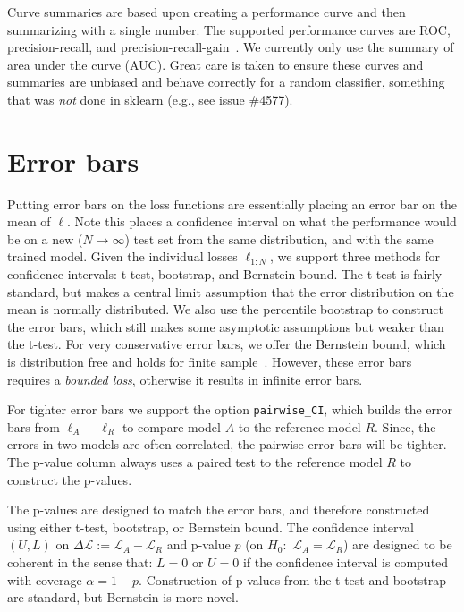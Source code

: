 \documentclass{article}
\newcommand{\Loss}{\mathcal{L}}
\newcommand{\loss}{\ell}
\newcommand{\code}{\texttt}
\begin{document}
Curve summaries are based upon creating a performance curve and then summarizing with a single number.
The supported performance curves are ROC, precision-recall, and precision-recall-gain~\citep{Flach2015}.
We currently only use the summary of area under the curve (AUC)\@.
Great care is taken to ensure these curves and summaries are unbiased and behave correctly for a random classifier, something that was \emph{not} done in sklearn (e.g., see issue \#4577)\@.

\section{Error bars}

Putting error bars on the loss functions are essentially placing an error bar on the mean of $\loss$.
Note this places a confidence interval on what the performance would be on a new ($N \rightarrow \infty$) test set from the same distribution, and with the same trained model.
Given the individual losses $\loss_{1:N}$, we support three methods for confidence intervals: t-test, bootstrap, and Bernstein bound.
The t-test is fairly standard, but makes a central limit assumption that the error distribution on the mean is normally distributed.
We also use the percentile bootstrap to construct the error bars, which still makes some asymptotic assumptions but weaker than the t-test.
For very conservative error bars, we offer the Bernstein bound, which is distribution free and holds for finite sample~\citep{Audibert2009}.
However, these error bars requires a \emph{bounded loss}, otherwise it results in infinite error bars.

For tighter error bars we support the option \code{pairwise\_CI}, which builds the error bars from $\loss_A - \loss_R$ to compare model $A$ to the reference model $R$.
Since, the errors in two models are often correlated, the pairwise error bars will be tighter.
The p-value column always uses a paired test to the reference model $R$ to construct the p-values.

The p-values are designed to match the error bars, and therefore constructed using either t-test, bootstrap, or Bernstein bound.
The confidence interval $(U,L)$ on $\Delta \Loss := \Loss_A - \Loss_R$ and p-value $p$ (on $H_0$:~$\Loss_A = \Loss_R$) are designed to be coherent in the sense that: $L = 0$ or $U = 0$ if the confidence interval is computed with coverage $\alpha=1-p$.
Construction of p-values from the t-test and bootstrap are standard, but Bernstein is more novel.
\end{document}
